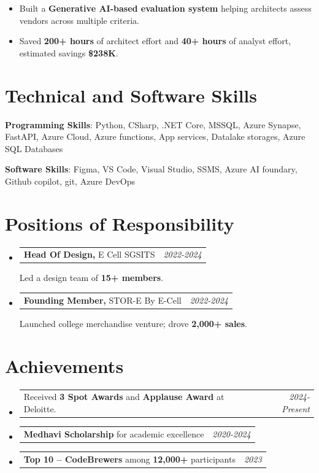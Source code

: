 \documentclass[a4paper,11pt]{article}
\makeatletter
\newcommand{\resumePOR}[3]{
\vspace{0.3mm}\item
    \begin{tabular*}{0.97\textwidth}[t]{l@{\extracolsep{\fill}}r}
        \textbf{#1}\hspace{0.3mm}#2 & \textit{\small{#3}} 
    \end{tabular*}
    \vspace{-1.5mm}
}
\newcommand{\resumeSubHeadingListStart}{\begin{itemize}[leftmargin=*,labelsep=0mm]}
\newcommand{\resumeItemListStart}{\begin{justify}\begin{itemize}[leftmargin=3ex,rightmargin=2ex,noitemsep,labelsep=1.2mm,itemsep=0mm]\small}
\newcommand{\resumeSubHeadingListEnd}{\end{itemize}\vspace{1mm}}
\newcommand{\resumeItemListEnd}{\end{itemize}\end{justify}\vspace{-1mm}}
\makeatother
\begin{document}
\resumeItemListStart
\item {Built a \textbf{Generative AI-based evaluation system} helping architects assess vendors across multiple criteria.}
\item {Saved \textbf{200+ hours} of architect effort and \textbf{40+ hours} of analyst effort, estimated savings \textbf{\$238K}.}
\resumeItemListEnd

\vspace{-2mm}


\section{\textbf{Technical and Software Skills}}

\begin{itemize}[leftmargin=0.1in,label={}]
\small{
\item{
\textbf{Programming Skills}: Python, CSharp, .NET Core, MSSQL, Azure Synapse, FastAPI, Azure Cloud, Azure functions, App services, Datalake storages, Azure SQL Databases
}
\item{
\textbf{Software Skills}: Figma, VS Code, Visual Studio, SSMS, Azure AI foundary, Github copilot, git, Azure DevOps 
}
}
\end{itemize}

\vspace{-2mm}


\section{\textbf{Positions of Responsibility}}

\resumeSubHeadingListStart

\resumePOR{Head Of Design, }
{E Cell SGSITS}
{2022-2024}

Led a design team of \textbf{15+ members}.

\resumePOR{Founding Member, }
{STOR-E By E-Cell}
{2022-2024}

Launched college merchandise venture; drove \textbf{2,000+ sales}.

\resumeSubHeadingListEnd

\vspace{-2mm}


\section{\textbf{Achievements}}

\resumeSubHeadingListStart

\resumePOR{}
{Received \textbf{3 Spot Awards} and \textbf{Applause Award} at Deloitte.}
{2024-Present}

\resumePOR{Medhavi Scholarship}
{ for academic excellence}
{2020-2024}

\resumePOR{Top 10 – CodeBrewers}
{ among \textbf{12,000+} participants}
{2023}

\resumeSubHeadingListEnd
\end{document}
